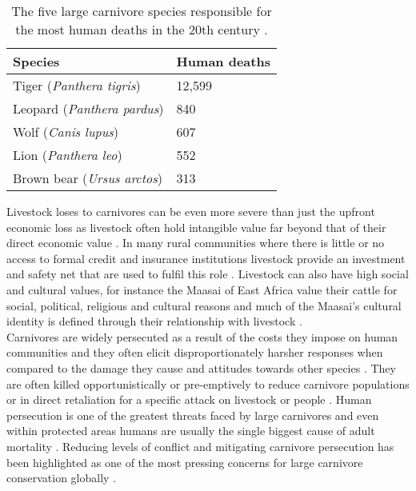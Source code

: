 \begin{table}[h]
	\small
	\begin{center}
		\begin{tabular}{l l}
			\hline \hline		
			Species 				& Human deaths\\ \hline
			Tiger (\textit{Panthera tigris})				& 12,599\\
			Leopard 	(\textit{Panthera pardus})			& 840\\
			Wolf	 (\textit{Canis lupus})			 		& 607\\
			Lion	 (\textit{Panthera leo})					& 552\\
			Brown bear (\textit{Ursus arctos}) 			& 313\\
			\hline \hline						
		\end{tabular}
		\caption{The five large carnivore species responsible for the most human deaths in the 20th century \cite{Loe2004a}.}
	\label{table:Deaths}
	\end{center}
\end{table}

Livestock loses to carnivores can be even more severe than just the upfront economic loss as livestock often hold intangible value far beyond that of their direct economic value \citep{Kansky2014e}. In many rural communities where there is little or no access to formal credit and insurance institutions livestock provide an investment and safety net that are used to fulfil this role \citep{Kurosaki1995,Andrew2003}. Livestock can also have high social and cultural values, for instance the Maasai of East Africa value their cattle for social, political, religious and cultural reasons and much of the Maasai's cultural identity is defined through their relationship with livestock \citep{Galaty2016a}.\\

Carnivores are widely persecuted as a result of the costs they impose on human communities \citep{Dickman2010b,dickman2013human,loveridge2010people,Woodroffe2005} and they often elicit disproportionately harsher responses when compared to the damage they cause and attitudes towards other species \citep{Kansky2014e,Dickman2010b}. They are often killed opportunistically or pre-emptively to reduce carnivore populations or in direct retaliation for a specific attack on livestock or people \citep{Thirgood2005}. Human persecution is one of the greatest threats faced by large carnivores and even within protected areas humans are usually the single biggest cause of adult mortality \citep{Woodroffe1998}. Reducing levels of conflict and mitigating carnivore persecution has been highlighted as one of the most pressing concerns for large carnivore conservation globally \citep{Woodroffe1998,Ray2005}.\\


